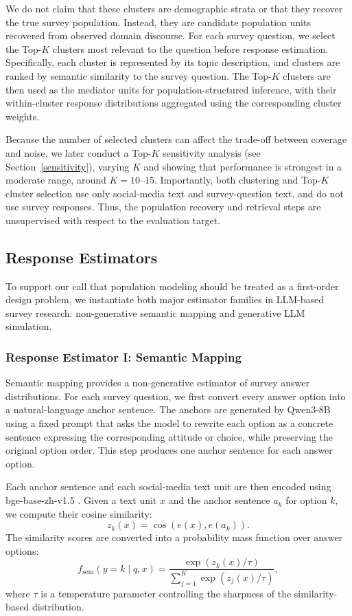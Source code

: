 \documentclass{article}
\begin{document}
We do not claim that these clusters are demographic strata or that they recover the true
survey population. Instead, they are candidate population units recovered from observed
domain discourse. For each survey question, we select the Top-$K$ clusters most relevant
to the question before response estimation. Specifically, each cluster is represented by
its topic description, and clusters are ranked by semantic
similarity to the survey question. The Top-$K$ clusters are
then used as the mediator units for population-structured inference, with their
within-cluster response distributions aggregated using the corresponding cluster weights.

Because the number of selected clusters can affect the trade-off between coverage and
noise, we later conduct a Top-$K$ sensitivity analysis (see Section~\ref{sensitivity}),
varying $K$ and showing that performance is strongest in a moderate range, around
$K=10$--$15$. Importantly, both clustering and Top-$K$ cluster selection use only
social-media text and survey-question text, and do not use survey responses. Thus, the
population recovery and retrieval steps are unsupervised with respect to the evaluation
target.

\subsection{Response Estimators}
To support our call that population modeling should be treated as a first-order design
problem, we instantiate both major estimator families in LLM-based survey research:
non-generative semantic mapping and generative LLM simulation.

\subsubsection{Response Estimator I: Semantic Mapping}
\label{SSR_sec}

Semantic mapping provides a non-generative estimator of survey answer distributions.
For each survey question, we first convert every answer option into a natural-language
anchor sentence.
The anchors are generated by Qwen3-8B using a fixed prompt that asks the model to rewrite
each option as a concrete sentence expressing the corresponding attitude or choice, while
preserving the original option order.
This step produces one anchor sentence for each answer option.

Each anchor sentence and each social-media text unit are then encoded using
bge-base-zh-v1.5 \cite{bge_base_zh_v15}.
Given a text unit $x$ and the anchor sentence $a_k$ for option $k$, we compute their
cosine similarity:
\[
z_k(x) = \cos(e(x), e(a_k)).
\]
The similarity scores are converted into a probability mass function over answer options:
\[
f_{\mathrm{sem}}(y=k \mid q,x)
=
\frac{\exp(z_k(x)/\tau)}
{\sum_{j=1}^{K}\exp(z_j(x)/\tau)},
\]
where $\tau$ is a temperature parameter controlling the sharpness of the similarity-based
distribution.
\end{document}
